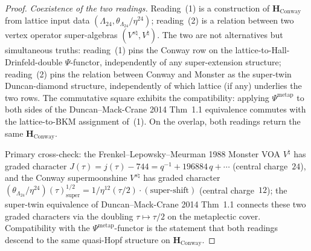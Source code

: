 \begin{proof}[Proof]
\emph{Coexistence of the two readings.}
Reading~(1) is a construction of
$\mathbf{H}_{\mathrm{Conway}}$ from lattice input data
$(\Lambda_{24}, \theta_{\Lambda_{24}}/\eta^{24})$; reading~(2) is a
relation between two vertex operator super-algebras
$(V^{s\natural}, V^\natural)$. The two are not alternatives but
simultaneous truths: reading~(1) pins the Conway row on the
lattice-to-Hall-Drinfeld-double $\Psi$-functor, independently of
any super-extension structure; reading~(2) pins the relation between
Conway and Monster as the super-twin Duncan-diamond structure,
independently of which lattice (if any) underlies the two rows.
The commutative square exhibits the compatibility: applying
$\Psi^{\mathrm{metap}}$ to both sides of the Duncan--Mack-Crane
2014 Thm~1.1 equivalence commutes with the
lattice-to-BKM assignment of~(1). On the overlap, both readings
return the same $\mathbf{H}_{\mathrm{Conway}}$.

Primary cross-check: the Frenkel--Lepowsky--Meurman 1988 Monster
VOA $V^\natural$ has graded character $J(\tau) = j(\tau) - 744 =
q^{-1} + 196884\,q + \cdots$ (central charge~$24$), and the Conway
supermoonshine $V^{s\natural}$ has graded character
$(\theta_{\Lambda_{24}}/\eta^{24})(\tau)^{1/2}_{\mathrm{super}} =
1/\eta^{12}(\tau/2)\cdot (\text{super-shift})$ (central charge~$12$);
the super-twin equivalence of Duncan--Mack-Crane 2014 Thm~1.1
connects these two graded characters via the doubling
$\tau\mapsto\tau/2$ on the metaplectic cover. Compatibility with
the $\Psi^{\mathrm{metap}}$-functor is the statement that both
readings descend to the same quasi-Hopf structure on
$\mathbf{H}_{\mathrm{Conway}}$.
\end{proof}

